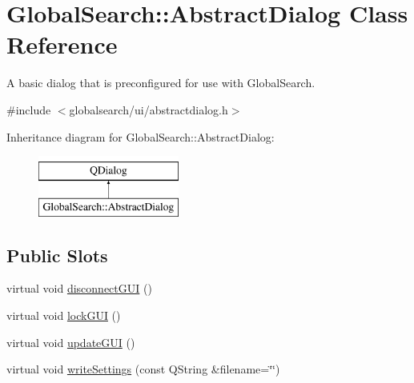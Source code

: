 \hypertarget{classGlobalSearch_1_1AbstractDialog}{}\section{Global\+Search\+:\+:Abstract\+Dialog Class Reference}
\label{classGlobalSearch_1_1AbstractDialog}


A basic dialog that is preconfigured for use with Global\+Search.  




{\ttfamily \#include $<$globalsearch/ui/abstractdialog.\+h$>$}

Inheritance diagram for Global\+Search\+:\+:Abstract\+Dialog\+:\begin{figure}[H]
\begin{center}
\leavevmode
\includegraphics[height=2.000000cm]{classGlobalSearch_1_1AbstractDialog}
\end{center}
\end{figure}
\subsection*{Public Slots}
\begin{DoxyCompactItemize}
\item 
virtual void \hyperlink{classGlobalSearch_1_1AbstractDialog_af25e016b17402f6695eb9428c197bce6}{disconnect\+G\+U\+I} ()
\item 
virtual void \hyperlink{classGlobalSearch_1_1AbstractDialog_af0a84714b098c38a3311299fc7f547bc}{lock\+G\+U\+I} ()
\item 
virtual void \hyperlink{classGlobalSearch_1_1AbstractDialog_a70a82283ccccb007cf0142f2e166240f}{update\+G\+U\+I} ()
\item 
virtual void \hyperlink{classGlobalSearch_1_1AbstractDialog_afab2e36367be4fa97e891b020afd1e60}{write\+Settings} (const Q\+String \&filename=\char`\"{}\char`\"{})
\end{DoxyCompactItemize}
